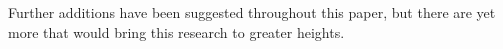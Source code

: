 \documentclass[12pt]{article}
\begin{document}
Further additions have been suggested throughout this paper, but there are yet more that would bring this research to greater heights.

%
%
%
%
% 
%
%
%
\end{document}
